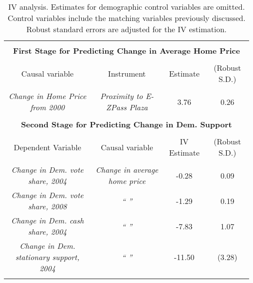 \begin{table}[!bp] \centering 
  \caption{IV analysis. Estimates for demographic control variables are omitted. Control variables include the matching variables previously discussed. Robust standard errors are adjusted for the IV estimation.} 
  \label{iv_analysis} 
\footnotesize \begin{tabular}{@{\extracolsep{5pt}} cccc} 
\\[-1.8ex]\hline 
\hline \\[-1.8ex] 
\multicolumn{4}{c}{\textbf{First Stage for Predicting Change in Average Home Price}} \\ 
\hline \\[-1.8ex] 
Causal variable & Instrument & Estimate & (Robust S.D.) \\ 
\hline \\[-1.8ex] 
\emph{Change in Home Price from 2000} & \emph{Proximity to E-ZPass Plaza} & 3.76 & 0.26 \\ 

\rule{0pt}{3ex}  & & & \\ 
\multicolumn{4}{c}{\textbf{Second Stage for Predicting  Change in Dem. Support}} \\ 
\hline \\[-1.8ex] 
Dependent Variable & Causal variable & IV Estimate & (Robust S.D.) \\ 
\hline \\[-1.8ex] 
\emph{Change in Dem. vote share, 2004} & \emph{Change in average home price}  & -0.28 & 0.09 \\ 

\emph{Change in Dem. vote share, 2008} & \emph{ `` ''  }  & -1.29 & 0.19 \\ 

\emph{Change in Dem. cash share, 2004}  & \emph{ `` ''  }  & -7.83 & 1.07 \\ 

\emph{Change in Dem. stationary support, 2004} & \emph{  `` '' } & -11.50 & (3.28) \\ 
\hline \\[-1.8ex] 
\end{tabular} 
\end{table} 